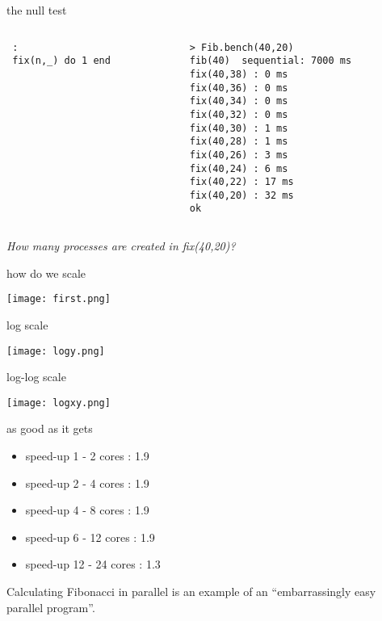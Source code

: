 \begin{frame}[fragile]{the null test}

\begin{columns}
\begin{column}{0.5\linewidth}
\begin{verbatim}
 :
 fix(n,_) do 1 end
\end{verbatim}
\end{column}
\pause
\begin{column}{0.5\linewidth}
\begin{verbatim}
> Fib.bench(40,20)
fib(40)  sequential: 7000 ms
fix(40,38) : 0 ms
fix(40,36) : 0 ms
fix(40,34) : 0 ms
fix(40,32) : 0 ms
fix(40,30) : 1 ms
fix(40,28) : 1 ms
fix(40,26) : 3 ms
fix(40,24) : 6 ms
fix(40,22) : 17 ms
fix(40,20) : 32 ms
ok
\end{verbatim}
\end{column}
\end{columns}

\pause\vspace{20pt} 
{\em How many processes are created in fix(40,20)?}

\end{frame}

\begin{frame}{how do we scale}

\texttt{[image: first.png]}

\end{frame}

\begin{frame}{log scale}

\texttt{[image: logy.png]}

\end{frame}

\begin{frame}{log-log scale}
 
\texttt{[image: logxy.png]}

\end{frame}

\begin{frame}{as good as it gets}

\begin{itemize}
  \item speed-up 1 - 2 cores : 1.9 %
  \item speed-up 2 - 4 cores : 1.9 %
  \item speed-up 4 - 8 cores : 1.9 %
  \item speed-up 6 - 12 cores : 1.9 %
\pause
  \item speed-up 12 - 24 cores : 1.3 %
\end{itemize}

\pause\vspace{20pt}

Calculating Fibonacci in parallel is an example of an ``embarrassingly
easy parallel program''.

\end{frame}

